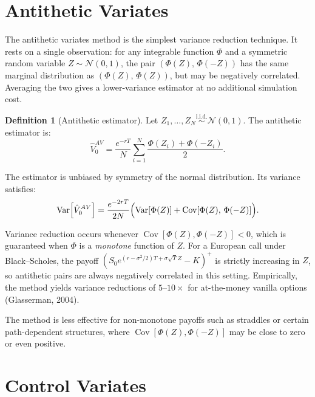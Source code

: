 \documentclass[12pt, a4paper]{report}
\theoremstyle{definition}
\newtheorem{definition}{Definition}[chapter]
\newcommand{\Var}{\operatorname{Var}}
\newcommand{\Cov}{\operatorname{Cov}}
\begin{document}
\section{Antithetic Variates}
\label{sec:antithetic}

The antithetic variates method is the simplest variance reduction
technique.  It rests on a single observation: for any integrable function
$\Phi$ and a symmetric random variable $Z \sim \mathcal{N}(0,1)$, the
pair $(\Phi(Z),\, \Phi(-Z))$ has the same marginal distribution as
$(\Phi(Z),\, \Phi(Z))$, but may be negatively correlated.  Averaging the
two gives a lower-variance estimator at no additional simulation cost.

\begin{definition}[Antithetic estimator]
Let $Z_1, \ldots, Z_N \overset{\text{i.i.d.}}{\sim} \mathcal{N}(0,1)$.
The antithetic estimator is:
\begin{equation}
    \hat{V}_0^{AV} = \frac{e^{-rT}}{N} \sum_{i=1}^{N}
    \frac{\Phi(Z_i) + \Phi(-Z_i)}{2}.
    \label{eq:av-estimator}
\end{equation}
\end{definition}

The estimator is unbiased by symmetry of the normal distribution.  Its
variance satisfies:
\begin{equation}
    \Var\!\left[\hat{V}_0^{AV}\right]
    = \frac{e^{-2rT}}{2N}
    \Bigl(\Var[\Phi(Z)] + \Cov[\Phi(Z),\,\Phi(-Z)]\Bigr).
    \label{eq:av-variance}
\end{equation}

Variance reduction occurs whenever $\Cov[\Phi(Z),\Phi(-Z)] < 0$, which
is guaranteed when $\Phi$ is a \emph{monotone} function of $Z$.  For a
European call under Black--Scholes, the payoff
$(S_0 e^{(r - \sigma^2/2)T + \sigma\sqrt{T}Z} - K)^+$ is strictly
increasing in $Z$, so antithetic pairs are always negatively correlated
in this setting.  Empirically, the method yields variance reductions of
$5$--$10\times$ for at-the-money vanilla options (Glasserman, 2004).

The method is less effective for non-monotone payoffs such as straddles
or certain path-dependent structures, where
$\Cov[\Phi(Z), \Phi(-Z)]$ may be close to zero or even positive.

\section{Control Variates}
\label{sec:control-variates}
\end{document}
